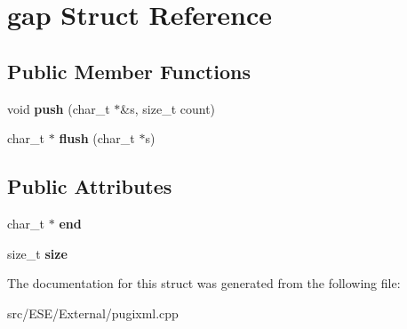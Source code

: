 \hypertarget{structgap}{\section{gap Struct Reference}
\label{structgap}
}
\subsection*{Public Member Functions}
\begin{DoxyCompactItemize}
\item 
\hypertarget{structgap_a9c0d0b12bc778c8439c8aec7747ab2b0}{void {\bfseries push} (char\-\_\-t $\ast$\&s, size\-\_\-t count)}\label{structgap_a9c0d0b12bc778c8439c8aec7747ab2b0}

\item 
\hypertarget{structgap_a176c58ee8d57c41b91ae9f00d5e8cab5}{char\-\_\-t $\ast$ {\bfseries flush} (char\-\_\-t $\ast$s)}\label{structgap_a176c58ee8d57c41b91ae9f00d5e8cab5}

\end{DoxyCompactItemize}
\subsection*{Public Attributes}
\begin{DoxyCompactItemize}
\item 
\hypertarget{structgap_a1fafd4d9909a3413f723f24e46dfde0e}{char\-\_\-t $\ast$ {\bfseries end}}\label{structgap_a1fafd4d9909a3413f723f24e46dfde0e}

\item 
\hypertarget{structgap_ad5bb3597ade78d89bbe0e300748ad508}{size\-\_\-t {\bfseries size}}\label{structgap_ad5bb3597ade78d89bbe0e300748ad508}

\end{DoxyCompactItemize}


The documentation for this struct was generated from the following file\-:\begin{DoxyCompactItemize}
\item 
src/\-E\-S\-E/\-External/pugixml.\-cpp\end{DoxyCompactItemize}
